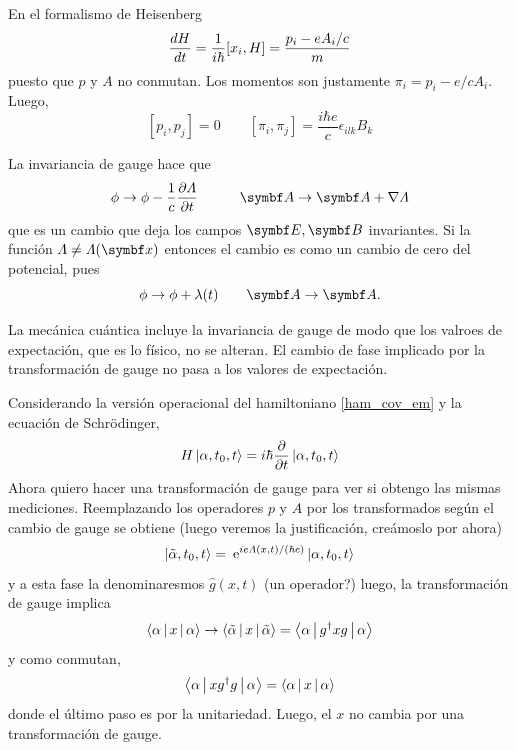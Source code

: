 \documentclass[10pt,oneside]{CBFT_book}
\begin{document}
En el formalismo de Heisenberg
\[
	\frac{d^{\hspace{-0.05em}} {H}}{d {t}^{\hspace{-0.05em}}} = \frac{1}{i\hbar}[x_i,H] = \frac{p_i - e A_i / c}{m}
\]
puesto que $p$ y $A$ no conmutan. Los momentos son justamente $\pi_i = p_i - e/c A_i$.
Luego,
\[
	[ p_i, p_j ] = 0 \qquad 
	[ \pi_i , \pi_j ] = \frac{i\hbar e}{c} \epsilon_{i l k}B_k
\]

La invariancia de gauge hace que
\[
	\phi \to \phi - \frac{1}{c}\dpar{\Lambda}{t} \qquad \quad 
	\vb A \to \vb A + \nabla \Lambda
\]
que es un cambio que deja los campos $\vb E, \vb B$ invariantes. Si la función $\Lambda \neq \Lambda(\vb x)$
entonces el cambio es como un cambio de cero del potencial, pues 
\[
	\phi \to \phi + \lambda(t) \qquad \vb A \to \vb A.
\]

La mecánica cuántica incluye la invariancia de gauge de modo que los valroes de expectación, que es lo
físico, no se alteran.
El cambio de fase implicado por la transformación de gauge no pasa a los valores de expectación.

Considerando la versión operacional del hamiltoniano \eqref{ham_cov_em} y la ecuación de Schrödinger,
\[
	H \Ket{\alpha,t_0,t} = i \hbar \frac{\partial^{\hspace{-0.05em}} {}}{\partial {t}^{\hspace{-0.05em}}} \Ket{\alpha,t_0,t}
\]
Ahora quiero hacer una transformación de gauge para ver si obtengo las mismas mediciones.
Reemplazando los operadores $p$ y $A$ por los transformados según el cambio de gauge se obtiene
(luego veremos la justificación, creámoslo por ahora)
\[
	\Ket{\tilde{\alpha},t_0,t} = \:\mathrm{e}^{ i e \Lambda(x,t)/(\hbar c)}\Ket{\alpha,t_0,t} 
\]
y a esta fase la denominaresmos $\hat{g}(x,t)$ (un operador?) luego, la transformación de gauge implica
\[
	\Braket{\alpha|x|\alpha} \to  \Braket{\tilde{\alpha}|x|\tilde{\alpha}} = \Braket{\alpha|g^\dagger x g|\alpha}
\]
y como conmutan,
\[
	\Braket{\alpha|x g^\dagger g|\alpha} = \Braket{\alpha|x|\alpha}
\]
donde el último paso es por la unitariedad. Luego, el $x$ no cambia por una transformación de gauge.
\end{document}
